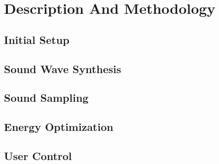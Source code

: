 \section{Description And Methodology}


\subsection{Initial Setup}


\subsection{Sound Wave Synthesis}


\subsection{Sound Sampling}


\subsection{Energy Optimization}



\subsection{User Control}











